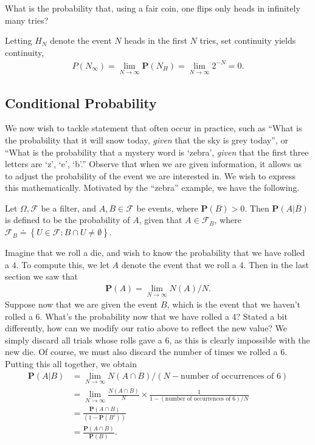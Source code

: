\begin{example}What is the probability that, using a fair coin, one
	flips only heads in infinitely many tries? 
\end{example}
Letting $H_N$ denote the event
$N$ heads in the first $N$ tries, set continuity yields
continuity,
\begin{align*}
	P(N_\infty) = \lim_{N \to \infty} \mathbf{P}(N_H) = \lim_{N \to \infty} 2^{-N} = 
	0.
\end{align*}
\subsection{Conditional Probability}
We now wish to tackle statement that often occur in practice,
such as ``What is the probability that it will snow today, \emph{given}
that the sky is grey today'', or ``What is the probability that a mystery word
is `zebra', \emph{given} that the first three letters are
`z', `e', `b'.''
Observe that when we are given information, it allows us to adjust the
probability of the event we are interested in. We wish to express this
mathematically. Motivated by the ``zebra'' example, we have the following.
\begin{definition}
	Let $\Omega, \mathcal{F}$ be a filter, and $A, B \in \mathcal{F}$ be events, where
	$\mathbf{P}(B) > 0$. Then $\mathbf{P}(A | B)$ is defined to be the probability of 
	$A$, given that $A \in \mathcal{F}_B$, where $\mathcal{F}_B
	\doteq \left\{ U \in \mathcal{F}: B \cap U \neq \emptyset \right\}$.
\end{definition}
Imagine that we roll a die, and wish to know the probability that
we have rolled a $4$.
To compute this, we let $A$ denote the event that we roll a $4$. Then in the 
last section we saw
that
\begin{align*}
	\mathbf{P}(A) = \lim_{N \to \infty} N(A)/N.
\end{align*}
Suppose now that we are given the event $B$, which is the event that we haven't
rolled a $6$.
What's the probability now that we have rolled a $4$?
Stated a bit differently, how can we modify our ratio above to reflect the
new value? We simply discard all trials whose rolls gave a $6$, as this is 
clearly
impossible with the new die. Of course, we must also discard the number of times
we rolled a $6$. Putting this all together, we obtain
\begin{align*}
	\mathbf{P}(A | B) & = \lim_{N \to \infty} N(A \cap B)/(N -
	\text{number of occurrences of $6$})
	\\
	& = \lim_{N \to \infty} \frac{N(A \cap B)}{N}
	\times \frac{1}{1 - (\text{number of occurrences of $6$})/N}
	\\
	& = \frac{\mathbf{P}(A \cap B)}{(1 - \mathbf{P}(B^c))}
	\\
	& = \frac{\mathbf{P}(A \cap B)}{\mathbf{P}(B)}.
\end{align*}
